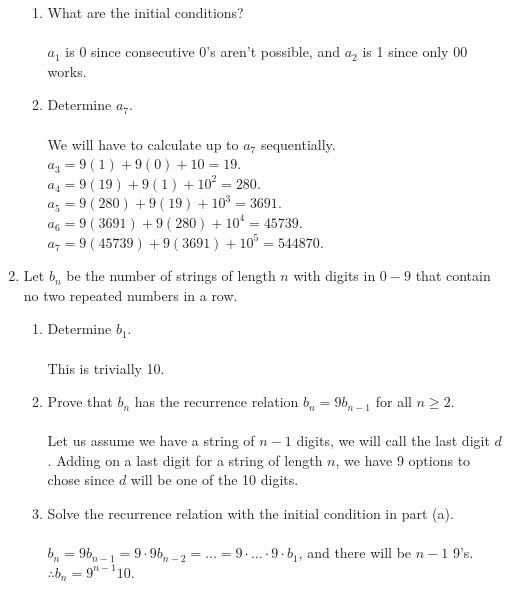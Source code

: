 \documentclass[12pt]{article}
\begin{document}
\begin{enumerate}
\begin{enumerate}
\item What are the initial conditions?\\\\
$a_1$ is 0 since consecutive 0's aren't possible, and $a_2$ is 1 since only 00 works. 
\item Determine $a_7$.\\\\
We will have to calculate up to $a_7$ sequentially.\\
$a_3 = 9(1) + 9(0) + 10 = 19$.\\
$a_4 = 9(19) + 9(1) + 10^2 = 280$.\\
$a_5 = 9(280) + 9(19) + 10^3 = 3691$.\\
$a_6 = 9(3691) + 9(280) + 10^4 = 45739$.\\
$a_7 = 9(45739) + 9(3691) + 10^5 = 544870$.\\
\end{enumerate}


\medskip

\item Let $b_n$ be the number of strings of length $n$ with digits in $0-9$ that contain no two repeated numbers in a row.
\begin{enumerate}
\item Determine $b_1$.\\\\
This is trivially 10.
\item Prove that $b_n$ has the recurrence relation $b_n = 9b_{n-1}$ for all $n \geq 2$. \\\\
Let us assume we have a string of $n-1$ digits, we will call the last digit $d$. Adding on a last digit for a string of length $n$, we have 9 options to chose since $d$ will be one of the 10 digits. \qedsymbol
\item Solve the recurrence relation with the initial condition in part (a).\\\\
$b_n = 9b_{n-1} = 9\cdot9b_{n-2} = \ldots = 9\cdot\ldots\cdot9\cdot b_1$, and there will be $n-1$ 9's. $\therefore b_n = 9^{n-1}10$.\qedsymbol
\end{enumerate}

\end{enumerate}
\end{document}
